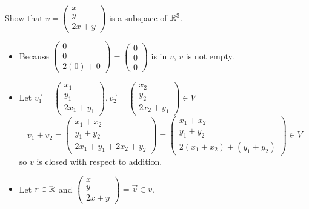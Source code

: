   \begin{problem}
    Show that $v=\left(\begin{smallmatrix}x\\y\\2x+y\end{smallmatrix}\right)$ is a subspace of $\mathbb{R}^3$.

    \begin{itemize}
      \item Because $\left(\begin{smallmatrix}0\\0\\2(0)+0\end{smallmatrix}\right)=\left(\begin{smallmatrix}0\\0\\0\end{smallmatrix}\right)$ is in $v$, $v$ is not empty.
      \item Let $\vec{v_1}=\left(\begin{smallmatrix}x_1\\y_1\\2x_1+y_1\end{smallmatrix}\right),\vec{v_2}=\left(\begin{smallmatrix}x_2\\y_2\\2x_2+y_1\end{smallmatrix}\right)\in V$
        \[
          v_1+v_2=\begin{pmatrix}
            x_1+x_2\\
            y_1+y_2\\
            2x_1+y_1+2x_2+y_2
          \end{pmatrix}
          = \begin{pmatrix}
            x_1+x_2\\
            y_1+y_2\\
            2(x_1+x_2)+(y_1+y_2)
          \end{pmatrix}
          \in V
        \]
        so $v$ is closed with respect to addition.
      \item Let $r\in\mathbb{R}$ and $\left(\begin{smallmatrix}x\\y\\2x+y\end{smallmatrix}\right)=\vec{v}\in v$.
    \end{itemize}
  \end{problem}

